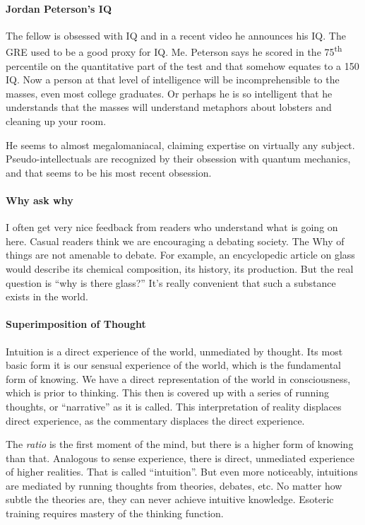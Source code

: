 \paragraph{Jordan Peterson's IQ}


The fellow is obsessed with IQ and in a recent video he announces his IQ. The GRE used to be a good proxy for IQ. Me. Peterson says he scored in the 75\textsuperscript{th} percentile on the quantitative part of the test and that somehow equates to a 150 IQ. Now a person at that level of intelligence will be incomprehensible to the masses, even most college graduates. Or perhaps he is so intelligent that he understands that the masses will understand metaphors about lobsters and cleaning up your room.

He seems to almost megalomaniacal, claiming expertise on virtually any subject. Pseudo-intellectuals are recognized by their obsession with quantum mechanics, and that seems to be his most recent obsession.

\paragraph{Why ask why}


I often get very nice feedback from readers who understand what is going on here. Casual readers think we are encouraging a debating society. The Why of things are not amenable to debate. For example, an encyclopedic article on glass would describe its chemical composition, its history, its production. But the real question is ``why is there glass?'' It's really convenient that such a substance exists in the world.

\paragraph{Superimposition of Thought}


Intuition is a direct experience of the world, unmediated by thought. Its most basic form it is our sensual experience of the world, which is the fundamental form of knowing. We have a direct representation of the world in consciousness, which is prior to thinking. This then is covered up with a series of running thoughts, or ``narrative'' as it is called. This interpretation of reality displaces direct experience, as the commentary displaces the direct experience.

The \emph{ratio} is the first moment of the mind, but there is a higher form of knowing than that. Analogous to sense experience, there is direct, unmediated experience of higher realities. That is called ``intuition''. But even more noticeably, intuitions are mediated by running thoughts from theories, debates, etc. No matter how subtle the theories are, they can never achieve intuitive knowledge. Esoteric training requires mastery of the thinking function.

